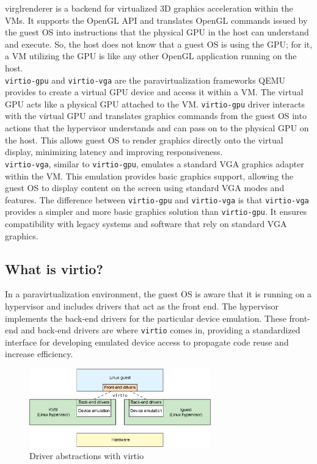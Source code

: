 \documentclass[a4paper,12pt, final]{report}
\begin{document}
\noindent virglrenderer is a backend for virtualized 3D graphics acceleration within the VMs. It supports the OpenGL API and translates OpenGL commands issued by the guest OS into instructions that the physical GPU in the host can understand and execute. So, the host does not know that a guest OS is using the GPU; for it, a VM utilizing the GPU is like any other OpenGL application running on the host.\\

\noindent \verb|virtio-gpu| and \verb|virtio-vga| are the paravirtualization frameworks QEMU provides to create a virtual GPU device and access it within a VM. The virtual GPU acts like a physical GPU attached to the VM. \verb|virtio-gpu| driver interacts with the virtual GPU and translates graphics commands from the guest OS into actions that the hypervisor understands and can pass on to the physical GPU on the host. This allows guest OS to render graphics directly onto the virtual display, minimizing latency and improving responsiveness.\\

\noindent \verb|virtio-vga|, similar to \verb|virtio-gpu|, emulates a standard VGA graphics adapter within the VM. This emulation provides basic graphics support, allowing the guest OS to display content on the screen using standard VGA modes and features. The difference between \verb|virtio-gpu| and \verb|virtio-vga| is that \verb|virtio-vga| provides a simpler and more basic graphics solution than \verb|virtio-gpu|. It ensures compatibility with legacy systems and software that rely on standard VGA graphics.

\subsection{What is virtio?}
In a paravirtualization environment, the guest OS is aware that it is running on a hypervisor and includes drivers that act as the front end. The hypervisor implements the back-end drivers for the particular device emulation. These front-end and back-end drivers are where \verb|virtio| comes in, providing a standardized interface for developing emulated device access to propagate code reuse and increase efficiency. \cite{virtio_ibm_article}\\

\begin{figure}[H]
    \centering
    \includegraphics[width=0.7\textwidth]{images/virtio_stack.png}
    \caption{Driver abstractions with virtio \cite{virtio_ibm_article}}
    \label{fig:virtio_stack}
\end{figure}
\end{document}
